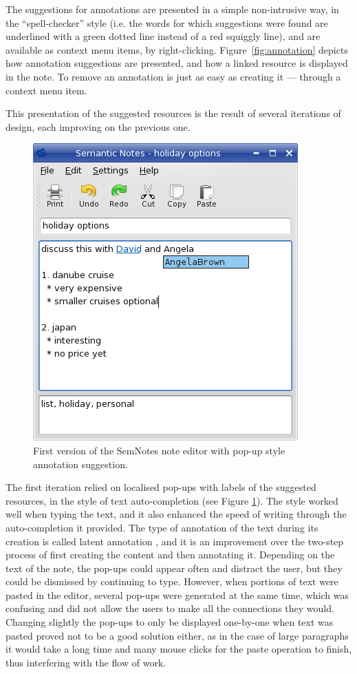 The suggestions for annotations are presented in a simple non-intrusive way, in the ``spell-checker'' style (i.e. the words for which suggestions were found are underlined with a green dotted line instead of a red squiggly line), and are available as context menu items, by right-clicking. Figure~\ref{fig:annotation} depicts how annotation suggestions are presented, and how a linked resource is displayed in the note. To remove an annotation is just as easy as creating it --- through a context menu item.

This presentation of the suggested resources is the result of several iterations of design, each improving on the previous one. 

\begin{figure}[tb]
 \includegraphics[width=0.6\linewidth]{chapters/core/img/linkednote_v1}
\caption{First version of the SemNotes note editor with pop-up style annotation suggestion.}
\label{fig:popup}
\end{figure} 

The first iteration relied on localised pop-ups with labels of the suggested resources, in the style of text auto-completion (see Figure \ref{fig:popup}). The style worked well when typing the text, and it also enhanced the speed of writing through the auto-completion it provided. The type of annotation of the text during its creation is called latent annotation \cite{Davis2010}, and it is an improvement over the two-step process of first creating the content and then annotating it. Depending on the text of the note, the pop-ups could appear often and distract the user, but they could be dismissed by continuing to type. However, when portions of text were pasted in the editor, several pop-ups were generated at the same time, which was confusing and did not allow the users to make all the connections they would. Changing slightly the pop-ups to only be displayed one-by-one when text was pasted proved not to be a good solution either, as in the case of large paragraphs it would take a long time and many mouse 
clicks for the paste operation to finish, thus interfering with the flow of work. 

